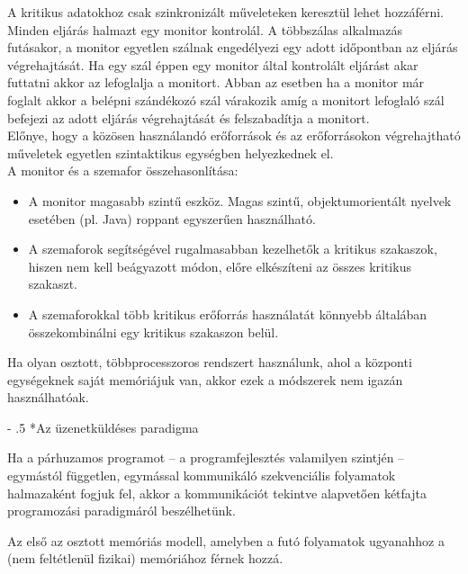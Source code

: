 \documentclass[tikz,12pt,margin=0px]{article}
\makeatletter
\renewcommand\paragraph{%
	\@startsection{paragraph}{4}{0mm}%
	{-\baselineskip}%
	{.5\baselineskip}%
	{\normalfont\normalsize\bfseries}}
\makeatother
\begin{document}
    \noindent A  kritikus  adatokhoz  csak  szinkronizált  műveleteken keresztül lehet hozzáférni.\\

    \noindent Minden eljárás halmazt egy monitor kontrolál. A többszálas alkalmazás futásakor, a monitor egyetlen szálnak engedélyezi egy adott időpontban az eljárás végrehajtását. Ha egy szál  éppen egy monitor által kontrolált eljárást akar futtatni akkor az lefoglalja a monitort. Abban az esetben ha a monitor már foglalt akkor a belépni szándékozó szál várakozik amíg  a monitort lefoglaló szál befejezi az adott eljárás végrehajtását és felszabadítja a monitort.\\

    \noindent Előnye, hogy a közösen használandó erőforrások és az erőforrásokon végrehajtható műveletek egyetlen szintaktikus egységben helyezkednek el.\\

    \noindent A monitor és a szemafor összehasonlítása:
    \begin{itemize}[topsep=8pt,itemsep=4pt,partopsep=4pt, parsep=4pt]
        \item A monitor magasabb szintű eszköz. Magas szintű, objektumorientált nyelvek esetében (pl. Java) roppant egyszerűen használható.
        \item A szemaforok segítségével rugalmasabban kezelhetők a kritikus szakaszok, hiszen nem kell beágyazott módon, előre elkészíteni az összes kritikus szakaszt.
        \item A szemaforokkal több kritikus erőforrás használatát könnyebb általában összekombinálni egy kritikus szakaszon belül.
    \end{itemize}

    \noindent Ha olyan osztott, többprocesszoros rendszert használunk, ahol a központi egységeknek saját memóriájuk van, akkor ezek a módszerek nem igazán használhatóak.

    \paragraph*{Az üzenetküldéses paradigma}

    Ha a párhuzamos programot – a programfejlesztés valamilyen szintjén – egymástól független, egymással kommunikáló szekvenciális folyamatok halmazaként fogjuk fel,  akkor  a  kommunikációt  tekintve  alapvetően  kétfajta  programozási  paradigmáról beszélhetünk.

    \noindent Az első az osztott memóriás modell, amelyben a futó folyamatok ugyanahhoz a (nem feltétlenül fizikai) memóriához férnek hozzá.\\
\end{document}
